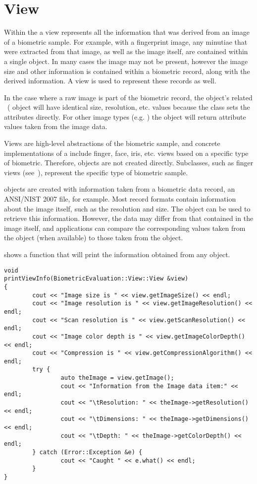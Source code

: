 %
%
\chapter{View}
\label{chp-view}
Within the \lname a view represents all the information that was derived
from an image of a biometric sample. For example, with a fingerprint image, any
minutiae that were extracted from that image, as well as the image itself,
are contained within a single  object. In many cases the image may
not be present, however the image size and other information is contained within
a biometric record, along with the derived information. A view is used
to represent these records as well.

In the case where a raw image is part of the biometric record, the  
object's related ~( object will have identical
size,
resolution, etc. values because the  class sets the 
attributes directly.
For other image types (e.g. ) the  object will return
attribute values taken from the image data.

Views are high-level abstractions of the biometric sample, and concrete
implementations of a  include finger, face, iris, etc. views based
on a specific type of biometric. Therefore,  objects are not
created directly. Subclasses, such as finger views (see~),
represent the specific type of biometric sample.

 objects are created with information taken from a biometric data
record, an ANSI/NIST 2007 file, for example. Most record formats contain 
information about the image itself, such as the resolution and size. The object
can be used to retrieve this information. However, the data may differ from that
contained in the image itself, and applications can compare the corresponding
values taken from the  object (when available) to those taken from 
the  object.

 shows a function that will print the information obtained
from any  object.

\begin{lstlisting}[caption={View::View Class}, label=lst:viewuse]
void
printViewInfo(BiometricEvaluation::View::View &view)
{
        cout << "Image size is " << view.getImageSize() << endl;
        cout << "Image resolution is " << view.getImageResolution() << endl;
        cout << "Scan resolution is " << view.getScanResolution() << endl;
        cout << "Image color depth is " << view.getImageColorDepth() << endl;
        cout << "Compression is " << view.getCompressionAlgorithm() << endl;
        try {
                auto theImage = view.getImage();
                cout << "Information from the Image data item:" << endl;
                cout << "\tResolution: " << theImage->getResolution() << endl;
                cout << "\tDimensions: " << theImage->getDimensions() << endl;
                cout << "\tDepth: " << theImage->getColorDepth() << endl;
        } catch (Error::Exception &e) {
                cout << "Caught " << e.what() << endl;
        }
}
\end{lstlisting}

